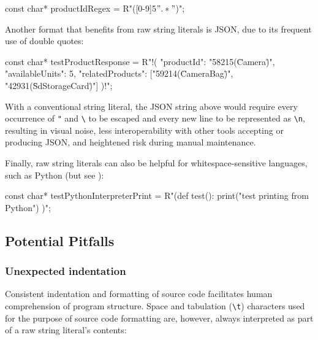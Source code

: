 \begin{emcppslisting}
const char* productIdRegex = R"([0-9]{5}\(".*"\))";
\end{emcppslisting}
    
\newpage%
\noindent Another format that benefits from raw string literals is JSON, due to
its frequent use of double quotes:

\begin{emcppslisting}
const char* testProductResponse = R"!(
{
    "productId": "58215(\"Camera\")",
    "availableUnits": 5,
    "relatedProducts": ["59214(\"CameraBag\")", "42931(\"SdStorageCard\")"]
})!";
\end{emcppslisting}
    
\noindent With a conventional string literal, the JSON string above would require
every occurrence of \lstinline!"! and \lstinline!\! to be escaped
and every new line to be represented as \lstinline!\n!, resulting
in visual noise, less interoperability with other tools accepting or
producing JSON, and heightened risk during manual maintenance.

Finally, raw string literals can also be helpful for
whitespace-sensitive languages, such as Python (but see ): 

\begin{emcppslisting}
const char* testPythonInterpreterPrint = R"(def test():
    print("test printing from Python")
)";
\end{emcppslisting}
    

\subsection[Potential Pitfalls]{Potential Pitfalls}\label{potential-pitfalls-rawstringliteral}

\subsubsection[Unexpected indentation]{Unexpected indentation}\label{unexpected-indentation}

Consistent indentation and formatting of source code facilitates human
comprehension of program structure. Space and tabulation
(\lstinline!\t!) characters used for the
purpose of source code formatting are, however, always interpreted as
part of a raw string literal's contents:

